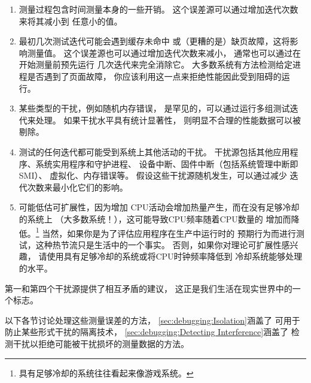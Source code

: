 \begin{enumerate}
\item	测量过程包含时间测量本身的一些开销。
	这个误差源可以通过增加迭代次数来将其减小到
	任意小的值。
\item	最初几次测试迭代可能会遇到缓存未命中
	或（更糟的是）缺页故障，这将影响测量值。
	这个误差源也可以通过增加迭代次数来减小，
	通常也可以通过在开始测量前预先运行
	几次迭代来完全消除它。
	大多数系统有方法检测给定进程是否遇到了页面故障，
	你应该利用这一点来拒绝性能因此受到阻碍的运行。
\item	某些类型的干扰，例如随机内存错误，
	是罕见的，可以通过运行多组测试迭代来处理。
	如果干扰水平具有统计显著性，
	则明显不合理的性能数据可以被剔除。
\item	测试的任何迭代都可能受到系统上其他活动的干扰。
	干扰源包括其他应用程序、系统实用程序和守护进程、
	设备中断、固件中断（包括系统管理中断即SMI）、
	虚拟化、内存错误等。
	假设这些干扰源随机发生，可以通过减少
	迭代次数来最小化它们的影响。
\item	{}可能低估可扩展性，因为增加
	CPU活动会增加热量产生，而在没有足够冷却的系统上
	（大多数系统！），这可能导致CPU频率随着CPU数量的
	增加而降低。\footnote{
		具有足够冷却的系统往往看起来像游戏系统。}
	当然，如果你是为了评估应用程序在生产中运行时的
	预期行为而进行测试，这种热节流只是生活中的一个事实。
	否则，如果你对理论可扩展性感兴趣，
	请使用具有足够冷却的系统或将CPU时钟频率降低到
	冷却系统能够处理的水平。
\end{enumerate}

第一和第四个干扰源提供了相互矛盾的建议，
这正是我们生活在现实世界中的一个标志。

\QuickQuizEnd

以下各节讨论处理这些测量误差的方法，
\cref{sec:debugging:Isolation}涵盖了
可用于防止某些形式干扰的隔离技术，
\cref{sec:debugging:Detecting Interference}涵盖了
检测干扰以拒绝可能被干扰损坏的测量数据的方法。


